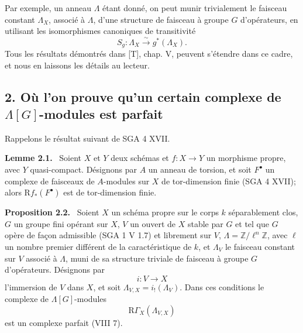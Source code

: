 \documentclass[11pt]{article}
\newenvironment{statement}[1]{\par\medskip\noindent\textbf{#1.}\ }{\par\medskip}
\newcommand{\R}{\mathrm{R}}\newcommand{\RHomCore}{\mathrm{RHom}}
\providecommand{\R}{\mathrm R}
\begin{document}
Par exemple, un anneau $\Lambda$ étant donné, on peut munir trivialement le faisceau constant $\Lambda_X$, associé à $\Lambda$, d'une structure de faisceau à groupe $G$ d'opérateurs, en utilisant les isomorphismes canoniques de transitivité
\[
S_g:\Lambda_X\xrightarrow{\sim}g^*(\Lambda_X).
\]
Tous les résultats démontrés dans [T], chap. V, peuvent s'étendre dans ce cadre, et nous en laissons les détails au lecteur.

\subsection*{2. Où l'on prouve qu'un certain complexe de $\Lambda[G]$-modules est parfait}

Rappelons le résultat suivant de SGA 4 XVII.

\begin{statement}{Lemme 2.1}
Soient $X$ et $Y$ deux schémas et $f:X\to Y$ un morphisme propre, avec $Y$ quasi-compact. Désignons par $A$ un anneau de torsion, et soit $F^\bullet$ un complexe de faisceaux de $A$-modules sur $X$ de tor-dimension finie (SGA 4 XVII); alors $\R f_*(F^\bullet)$ est de tor-dimension finie.
\end{statement}

\begin{statement}{Proposition 2.2}
Soient $X$ un schéma propre sur le corps $k$ séparablement clos, $G$ un groupe fini opérant sur $X$, $V$ un ouvert de $X$ stable par $G$ et tel que $G$ opère de façon admissible (SGA 1 V 1.7) et librement sur $V$, $\Lambda=\mathbb Z/\ell^n\mathbb Z$, avec $\ell$ un nombre premier différent de la caractéristique de $k$, et $\Lambda_V$ le faisceau constant sur $V$ associé à $\Lambda$, muni de sa structure triviale de faisceau à groupe $G$ d'opérateurs. Désignons par
\[
i:V\longrightarrow X
\]
l'immersion de $V$ dans $X$, et soit $\Lambda_{V,X}=i_!(\Lambda_V)$. Dans ces conditions le complexe de $\Lambda[G]$-modules
\[
\R\Gamma_X(\Lambda_{V,X})
\]
est un complexe parfait (VIII 7).
\end{statement}
\end{document}
